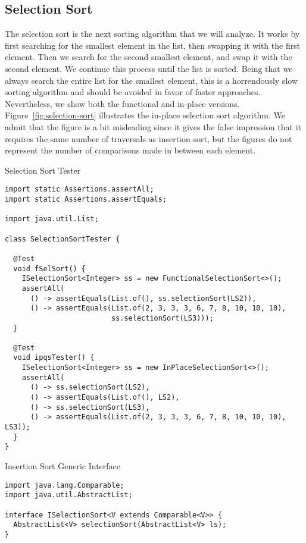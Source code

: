 \subsection{Selection Sort}
The selection sort is the next sorting algorithm that we will analyze. It works by first searching for the smallest element in the list, then swapping it with the first element. Then we search for the second smallest element, and swap it with the second element. We continue this process until the list is sorted. Being that we always search the entire list for the smallest element, this is a horrendously slow sorting algorithm and should be avoided in favor of faster approaches. Nevertheless, we show both the functional and in-place versions. Figure~\ref{fig:selection-sort} illustrates the in-place selection sort algorithm. We admit that the figure is a bit misleading since it gives the false impression that it requires the same number of traversals as insertion sort, but the figures do not represent the number of comparisons made in between each element.

\begin{cl}[]{Selection Sort Tester}
\begin{lstlisting}[language=MyJava]
import static Assertions.assertAll;
import static Assertions.assertEquals;

import java.util.List;

class SelectionSortTester {

  @Test
  void fSelSort() {
    ISelectionSort<Integer> ss = new FunctionalSelectionSort<>();
    assertAll(
      () -> assertEquals(List.of(), ss.selectionSort(LS2)),
      () -> assertEquals(List.of(2, 3, 3, 3, 6, 7, 8, 10, 10, 10), 
                         ss.selectionSort(LS3)));
  }

  @Test
  void ipqsTester() {
    ISelectionSort<Integer> ss = new InPlaceSelectionSort<>();
    assertAll(
      () -> ss.selectionSort(LS2),
      () -> assertEquals(List.of(), LS2),
      () -> ss.selectionSort(LS3),
      () -> assertEquals(List.of(2, 3, 3, 3, 6, 7, 8, 10, 10, 10), LS3));
  }
}
\end{lstlisting}
\end{cl}

\begin{cl}[]{Insertion Sort Generic Interface}
\begin{lstlisting}[language=MyJava]
import java.lang.Comparable;
import java.util.AbstractList;

interface ISelectionSort<V extends Comparable<V>> {
  AbstractList<V> selectionSort(AbstractList<V> ls);
}
\end{lstlisting}
\end{cl}

